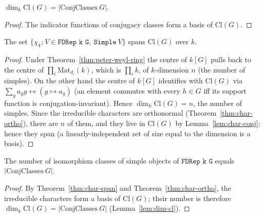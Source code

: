 \begin{lemma}[$\dim \mathrm{Cl}(G) = $ \#conjugacy classes]
  \label{lem:dim-cl}
  $\dim_k \mathrm{Cl}(G) = |\mathrm{ConjClasses}\ G|$.
\end{lemma}

\begin{proof}
  The indicator functions of conjugacy classes form a basis of
  $\mathrm{Cl}(G)$.
\end{proof}

\begin{theorem}
  \label{thm:char-span}
  The set $\{\chi_V : V \in \texttt{FDRep k G},\ \texttt{Simple}\ V\}$ spans
  $\mathrm{Cl}(G)$ over $k$.
\end{theorem}

\begin{proof}
  Under Theorem~\ref{thm:peter-weyl-ring} the centre of $k[G]$ pulls back to
  the centre of $\prod_i \mathrm{Mat}_{d_i}(k)$, which is $\prod_i k$, of
  $k$-dimension $n$ (the number of simples). On the other hand the centre
  of $k[G]$ identifies with $\mathrm{Cl}(G)$ via
  $\sum_g a_g g \leftrightarrow (g \mapsto a_g)$ (an element commutes with
  every $h \in G$ iff its support function is conjugation-invariant). Hence
  $\dim_k \mathrm{Cl}(G) = n$, the number of simples. Since the irreducible
  characters are orthonormal (Theorem~\ref{thm:char-ortho}), there are
  $n$ of them, and they live in $\mathrm{Cl}(G)$ by Lemma~\ref{lem:char-conj};
  hence they span (a linearly-independent set of size equal to the dimension
  is a basis).
\end{proof}

\begin{theorem}[Number of irreducibles = number of conjugacy classes]
  \label{thm:num-irreps}
  The number of isomorphism classes of simple objects of $\texttt{FDRep k G}$
  equals $|\mathrm{ConjClasses}\ G|$.
\end{theorem}

\begin{proof}
  By Theorem~\ref{thm:char-span} and Theorem~\ref{thm:char-ortho}, the
  irreducible characters form a basis of $\mathrm{Cl}(G)$; their number
  is therefore $\dim_k\mathrm{Cl}(G) = |\mathrm{ConjClasses}\ G|$
  (Lemma~\ref{lem:dim-cl}).
\end{proof}


